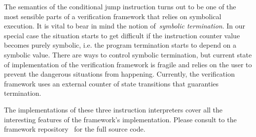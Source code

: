 The semantics of the conditional jump instruction turns out to be one of the
most sensible parts of a verification framework that relies on symbolical execution.
It is vital to bear in mind the notion of~\emph{symbolic termination}. In our special
case the situation starts to get difficult if the instruction counter value becomes
purely symbolic, i.e. the program termination starts to depend on a symbolic value.
There are ways to control symbolic termination, but current state of implementation of
the verification framework is fragile and relies on the user to prevent the dangerous
situations from happening. Currently, the verification framework uses an external
counter of state transitions that guaranties termination.

The implementations of these three instruction interpreters cover all the interesting
features of the framework's implementation. Please consult to the framework
repository~\cite{IAMGithub} for the full source code.